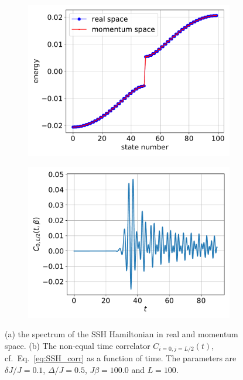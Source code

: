 \documentclass{SciPost}
\newcommand\0{\scalebox{-1}[1]{0}}
\begin{document}
\begin{figure}[t!]
	\centering
	\begin{subfigure}[a]{0.496\textwidth}
		\includegraphics[width=\textwidth]{SSH_spectrum.pdf}
	\end{subfigure}
	\begin{subfigure}[b]{0.496\textwidth}
		\includegraphics[width=\textwidth]{SSH_correlator.pdf}
	\end{subfigure}
	\caption{\label{fig:SSH} (a) the spectrum of the SSH Hamiltonian in real and momentum space. (b) The non-equal time correlator $C_{i=0,j=L/2}(t)$, cf.~Eq.~\eqref{eq:SSH_corr} as a function of time. The parameters are $\delta J/J=0.1$, $\Delta/J=0.5$, $J\beta=100.0$ and $L=100$.}  
\end{figure} 
\end{document}
